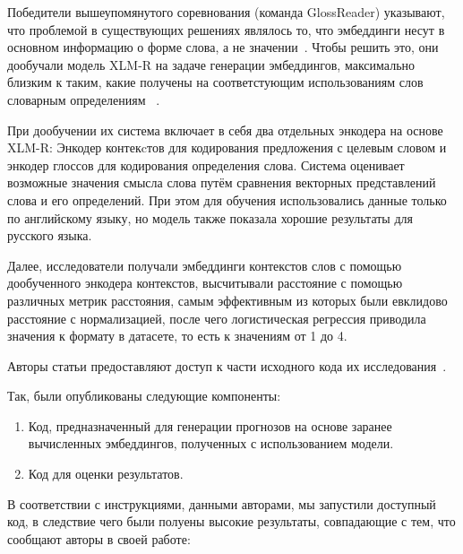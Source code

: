 \documentclass[LI,VKR]{HSEUniversity}
\begin{document}
Победители вышеупомянутого соревнования (команда GlossReader) указывают,
что проблемой в существующих решениях являлось то,
что эмбеддинги несут в основном информацию о форме слова, а не значении~\cite{GlossReader}.
Чтобы решить это, они дообучали модель XLM-R на задаче генерации эмбеддингов, максимально близким
к таким, какие получены на соответстующим использованиям слов словарным определениям
~\cite{XLM-R}.

При дообучении их система включает в себя два отдельных энкодера на основе XLM-R:
Энкодер контекcтов для кодирования предложения с целевым словом и
энкодер глоссов для кодирования определения слова.
Система оценивает возможные значения смысла слова путём сравнения векторных представлений слова
и его определений.
При этом для обучения использовались данные только по английскому языку,
но модель также показала хорошие результаты для русского языка.

Далее, исследователи получали эмбеддинги контекстов слов с помощью
дообученного энкодера контекстов, высчитывали расстояние с помощью различных метрик расстояния,
самым эффективным из которых были евклидово расстояние с нормализацией, после чего
логистическая регрессия приводила значения к формату в датасете, то есть к значениям от 1 до 4.

Авторы статьи предоставляют доступ к части исходного кода их исследования~.

Так, были опубликованы следующие компоненты:
\begin{enumerate}
    \item Код, предназначенный для генерации прогнозов на основе заранее вычисленных эмбеддингов,
полученных с использованием модели.
    \item Код для оценки результатов.
\end{enumerate}


В соответствии с инструкциями, данными авторами, мы запустили доступный код,
в следствие чего были полуены высокие результаты, совпадающие с тем, что сообщают
авторы в своей работе:
\end{document}
